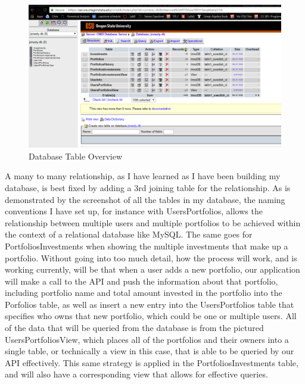 \documentclass[letterpaper,10pt,titlepage,journal,compsoc,draftclsnofoot,onecolumn]{IEEEtran}
\begin{document}
\begin{figure}[h]
\caption{Database Table Overview}
\centering
\includegraphics[width=\textwidth]{database_overview}
\end{figure}
A many to many relationship, as I have learned as I have been building my database, is best fixed by adding a 3rd joining table for the relationship. As is demonstrated by the screenshot of all the tables in my database, the naming conventions I have set up, for instance with UsersPortfolios, allows the relationship between multiple users and multiple portfolios to be achieved within the context of a relational database like MySQL. The same goes for PortfoliosInvestments when showing the multiple investments that make up a portfolio. Without going into too much detail, how the process will work, and is working currently, will be that when a user adds a new portfolio, our application will make a call to the API and push the information about that portfolio, including portfolio name and total amount invested in the portfolio into the Porfolios table, as well as insert a new entry into the UsersPortfolios table that specifies who owns that new portfolio, which could be one or multiple users. All of the data that will be queried from the database is from the pictured UsersPortfoliosView, which places all of the portfolios and their owners into a single table, or technically a view in this case, that is able to be queried by our API effectively. This same strategy is applied in the PortfoliosInvestments table, and will also have a corresponding view that allows for effective queries. 
\end{document}
